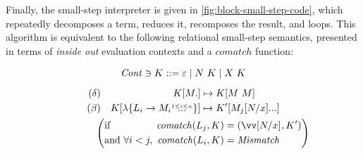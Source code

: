\documentclass[sigplan,screen]{acmart}
\begin{document}
Finally, the small-step interpreter is given in
\cref{fig:block-small-step-code}, which repeatedly decomposes a term, reduces
it, recomposes the result, and loops.  This algorithm is equivalent to the
following relational small-step semantics, presented in terms of \emph{inside
  out} evaluation contexts and a $\mathit{comatch}$ function:

\begin{gather*}
  \begin{alignedat}{2}
    \mathit{Cont} &\ni{}& K
    &::= \varepsilon
    \mid N ~ K
    \mid X ~ K
  \end{alignedat}
  \\[1ex]
  \begin{aligned}
    (\delta)&&
    K[M.] &\mapsto K[M ~ M]
    \\
    (\beta)&&
    K[\lambda\{\many[1 \leq i \leq n]{L_i \to M_i}\}]
    &\mapsto
    K'[M_j\many{\subst{x}{N}}]
  \end{aligned}
  \\
  \qquad\qquad
  \left(
    \begin{alignedat}{2}
      &\text{if } &\mathit{comatch}(L_j, K) &= (\vect{\subst{x}{N}}, K')
      \\
      &\text{and } &\forall i < j,~ \mathit{comatch}(L_i, K) &= \mathit{Mismatch}
    \end{alignedat}
  \right)
\end{gather*}




\end{document}
